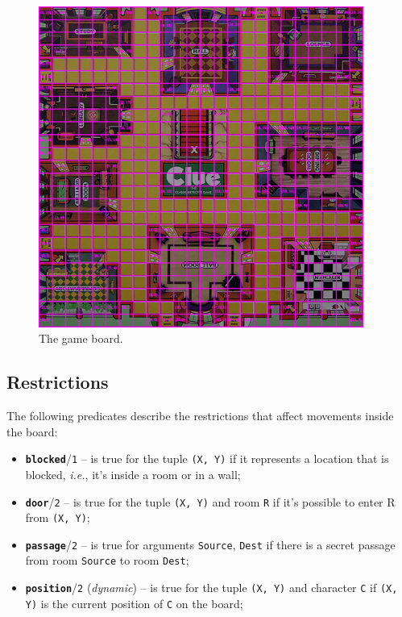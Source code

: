 \documentclass[12pt,a4paper]{article}
\newcommand{\varname}[1]{\texttt{#1}}
\newcommand{\varnamebf}[1]{\textbf{\texttt{#1}}}
\newcommand{\predprot}[2]{{\color{MidnightBlue}\varnamebf{#1}}/{\color{Mulberry}\varname{#2}}}
\begin{document}
\begin{figure}[H]
	\centering
	\includegraphics[width=0.95\textwidth]{board-grid.png}
	\caption{The game board.}
	\label{fig:board-grid}
\end{figure}

\subsection{Restrictions}

The following predicates describe the restrictions that affect movements inside the board:
\begin{itemize}
    \item \predprot{blocked}{1} -- is true for the tuple \varname{(X, Y)} if it represents a location that is blocked, \textit{i.e.}, it's inside a room or in a wall;
    
    \item \predprot{door}{2} -- is true for the tuple \varname{(X, Y)} and room \varname{R} if it's possible to enter R from \varname{(X, Y)};
    
    \item \predprot{passage}{2} -- is true for arguments \varname{Source}, \varname{Dest} if there is a secret passage from room \varname{Source} to room \varname{Dest};
    
    \item \predprot{position}{2} (\textit{dynamic}) -- is true for the tuple \varname{(X, Y)} and character \varname{C} if \varname{(X, Y)} is the current position of \varname{C} on the board;
\end{itemize}
\end{document}
